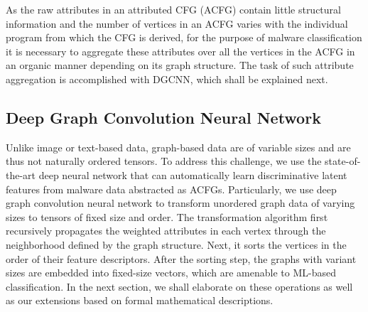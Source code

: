 As the raw attributes in an attributed CFG (ACFG) contain little structural information and the number of vertices in an ACFG varies with the individual program from which the CFG is derived, for the purpose of malware classification it is necessary to aggregate these attributes over all the vertices in the ACFG in an organic manner depending on its graph structure.
The task of such attribute aggregation is accomplished with DGCNN, which shall be explained next.




\subsection{Deep Graph Convolution Neural Network}
\label{MG:Subsec:DGCNN}

Unlike image or text-based data, graph-based data are of variable sizes and are thus not naturally ordered tensors.
To address this challenge, we use the state-of-the-art deep neural network that can automatically learn discriminative latent features from malware data abstracted as ACFGs.
Particularly, we use deep graph convolution neural network to transform unordered graph data of varying sizes to tensors of fixed size and order.
The transformation algorithm first recursively propagates the weighted attributes in each vertex through the neighborhood defined by the graph structure.
Next, it sorts the vertices in the order of their feature descriptors.
After the sorting step, the graphs with variant sizes are embedded into fixed-size vectors, which are amenable to ML-based classification.
In the next section, we shall elaborate on these operations as well as our extensions based on formal mathematical descriptions.
